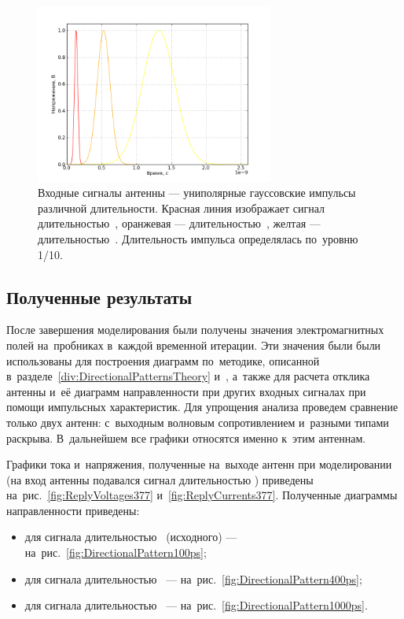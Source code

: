 \begin{figure}[p]
\centering
\includegraphics[width=0.7\textwidth]{graphics/directional-patterns-signals}
\caption{
    Входные сигналы антенны --- униполярные гауссовские импульсы различной
    длительности. Красная линия изображает сигнал длительностью~,
    оранжевая --- длительностью~,
    желтая --- длительностью~.
    Длительность импульса определялась по~уровню 1/10.}
\label{fig:DirectionalPatternsSignals}
\end{figure}


\subsection{Полученные результаты}

После завершения моделирования были получены значения электромагнитных полей
на~пробниках в~каждой временной итерации. Эти значения были были использованы
для построения диаграмм по~методике, описанной
    в~разделе~\ref{div:DirectionalPatternsTheory}
    и~\cite{bib:MescheryakovUnpublishedReport},
а~также для расчета отклика антенны и~её диаграмм направленности при других
входных сигналах при помощи импульсных характеристик. Для упрощения анализа
проведем сравнение только двух антенн: с~выходным волновым сопротивлением
 и~разными типами раскрыва. В~дальнейшем все графики относятся
именно к~этим антеннам.

Графики тока и~напряжения, полученные на~выходе антенн при моделировании
(на вход антенны подавался сигнал длительностью ) приведены
    на~рис.~\ref{fig:ReplyVoltages377}
    и~\ref{fig:ReplyCurrents377}.
Полученные диаграммы направленности приведены:
\begin{itemize}
\item для сигнала длительностью~ (исходного) ---
      на~рис.~\ref{fig:DirectionalPattern100ps};
\item для сигнала длительностью~ ---
      на~рис.~\ref{fig:DirectionalPattern400ps};
\item для сигнала длительностью~ ---
      на~рис.~\ref{fig:DirectionalPattern1000ps}.
\end{itemize}

